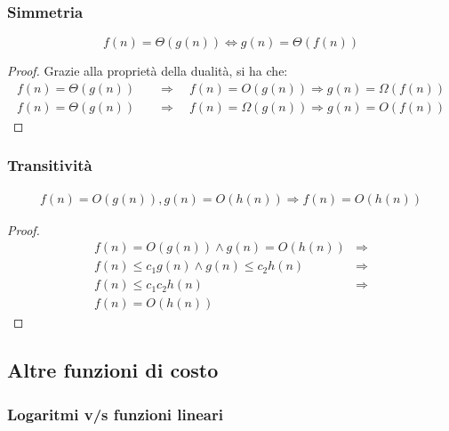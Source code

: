         \subsubsection{Simmetria}
            $$
                f(n) = \Theta(g(n)) \Leftrightarrow g(n) = \Theta(f(n))
            $$
            \begin{proof}
                Grazie alla proprietà della dualità, si ha che:
                $$
                    \begin{aligned}
                        f(n) = \Theta(g(n)) &\quad \Rightarrow \quad f(n) = O(g(n)) \Rightarrow g(n) = \Omega(f(n))\\
                        f(n) = \Theta(g(n)) &\quad \Rightarrow \quad f(n) = \Omega(g(n)) \Rightarrow g(n) = O(f(n))
                    \end{aligned}
                $$
            \end{proof}
        \subsubsection{Transitività}
            $$
                \begin{aligned}
                    f(n) = O(g(n)), g(n) = O(h(n)) \Rightarrow f(n) = O(h(n))
                \end{aligned}
            $$
            \begin{proof}
                $$
                    \begin{aligned}
                        f(n) = O(g(n)) \land g(n) = O(h(n)) & \Rightarrow \\
                        f(n) \leq c_1g(n) \land g(n) \leq c_2h(n) & \Rightarrow \\
                        f(n) \leq c_1c_2h(n) & \Rightarrow \\
                        f(n) = O(h(n)) &
                    \end{aligned}
                $$
            \end{proof}
    \subsection{Altre funzioni di costo}
        \subsubsection{Logaritmi v/s funzioni lineari}
